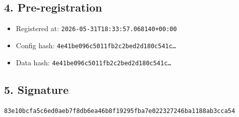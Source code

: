 \documentclass{article}
\begin{document}
\subsection*{4. Pre-registration}
\begin{itemize}
\item Registered at: \texttt{2026-05-31T18:33:57.068140+00:00}
\item Config hash: \texttt{4e41be096c5011fb2c2bed2d180c541c\dots}
\item Data hash: \texttt{4e41be096c5011fb2c2bed2d180c541c\dots}
\end{itemize}
\subsection*{5. Signature}
\texttt{83e10bcfa5c6ed0aeb7f8db6ea46b8f19295fba7e022327246ba1188ab3cca54}\\
\end{document}
